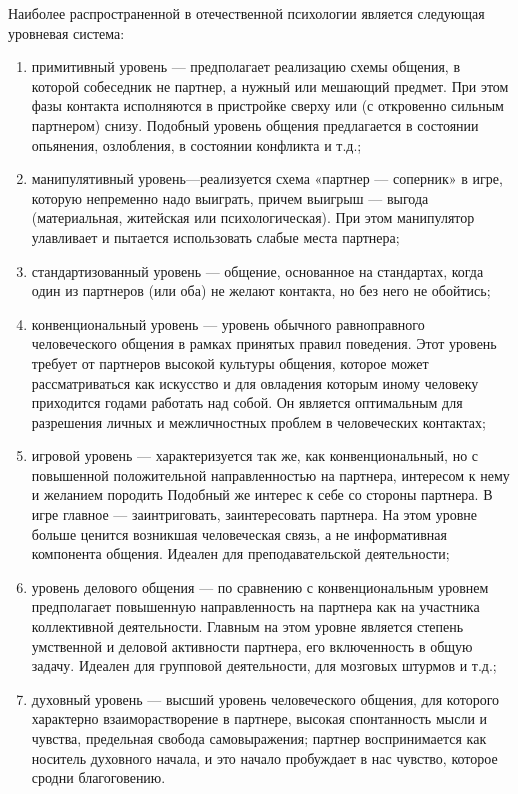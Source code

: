 Наиболее распространенной в отечественной психологии является следующая уровневая система:
\begin{enumerate}
	\item примитивный уровень — предполагает реализацию схемы общения, в которой собеседник не партнер, а нужный или мешающий предмет. При этом фазы контакта исполняются в пристройке сверху или (с откровенно сильным партнером) снизу. Подобный уровень общения предлагается в состоянии опьянения, озлобления, в состоянии конфликта и т.д.;
	\item манипулятивный уровень—реализуется схема «партнер — соперник» в игре, которую непременно надо выиграть, причем выигрыш — выгода (материальная, житейская или психологическая). При этом манипулятор улавливает и пытается использовать слабые места партнера;
	\item стандартизованный уровень — общение, основанное на стандартах, когда один из партнеров (или оба) не желают контакта, но без него не обойтись;
	\item конвенциональный уровень — уровень обычного равноправного человеческого общения в рамках принятых правил поведения. Этот уровень требует от партнеров высокой культуры общения, которое может рассматриваться как искусство и для овладения которым иному человеку приходится годами работать над собой. Он является оптимальным для разрешения личных и межличностных проблем в человеческих контактах;
	\item игровой уровень — характеризуется так же, как конвенциональный, но с повышенной положительной направленностью на партнера, интересом к нему и желанием породить Подобный же интерес к себе со стороны партнера. В игре главное — заинтриговать, заинтересовать партнера. На этом уровне больше ценится возникшая человеческая связь, а не информативная компонента общения. Идеален для преподавательской деятельности;
	\item уровень делового общения — по сравнению с конвенциональным уровнем предполагает повышенную направленность на партнера как на участника коллективной деятельности. Главным на этом уровне является степень умственной и деловой активности партнера, его включенность в общую задачу. Идеален для групповой деятельности, для мозговых штурмов и т.д.;
	\item духовный уровень — высший уровень человеческого общения, для которого характерно взаиморастворение в партнере, высокая спонтанность мысли и чувства, предельная свобода самовыражения; партнер воспринимается как носитель духовного начала, и это начало пробуждает в нас чувство, которое сродни благоговению. 
\end{enumerate}


